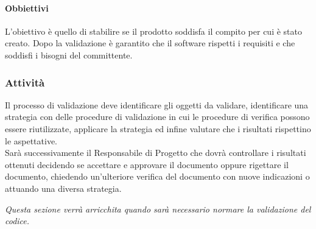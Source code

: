             \paragraph{Obbiettivi}
                L’obiettivo è quello di stabilire se il prodotto soddisfa il compito per cui è stato creato. Dopo la validazione è garantito che il software rispetti i requisiti e che soddisfi i bisogni del committente.
        \subsubsection{Attività}
            Il processo di validazione deve identificare gli oggetti da validare, identificare una strategia con delle procedure di validazione in cui le procedure di verifica possono essere riutilizzate, applicare la strategia ed infine valutare che i risultati rispettino le aspettative.\\
            Sarà successivamente il Responsabile di Progetto che dovrà controllare i risultati ottenuti decidendo se accettare e approvare il documento oppure rigettare il documento, chiedendo un’ulteriore verifica del documento con nuove indicazioni o attuando una diversa strategia.\\
        \begin{center}
            \emph{Questa sezione verrà arricchita quando sarà necessario normare la validazione del codice.}
        \end{center}
\newpage
            
            
            
            
            